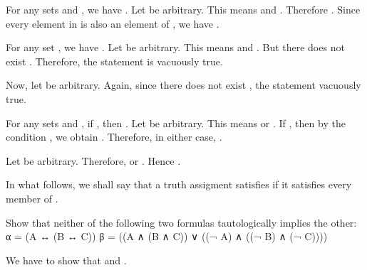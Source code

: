 \startexercises [title={\getvariable{document}{author}  \hfill  \getvariable{document}{course}  \hfill  2019-09-10}]
	
	\startproposition [title={Exercise 1.8}]
		For any sets  and , we have .
	\stopproposition
	\startproof
		Let  be arbitrary. This means  and . Therefore . Since every element in  is also an element of , we have .
	\stopproof

	\startproposition [title={Exercise 1.10}]
		For any set , we have .
	\stopproposition
	\startproof
		Let  be arbitrary. This means  and . But there does not exist . Therefore, the statement is vacuously true.

		Now, let  be arbitrary. Again, since there does not exist , the statement vacuously true.
	\stopproof

	\startproposition [title={Exercise 1.13}]
		For any sets  and , if , then .
	\stopproposition
	\startproof
		Let  be arbitrary. This means  or . If , then by the condition , we obtain . Therefore, in either case, .

		Let  be arbitrary. Therefore,  or . Hence .
	\stopproof

\stopexercises


\startexercises [title={\getvariable{document}{author}  \hfill  \getvariable{document}{course}  \hfill  2019-09-24}]

	In what follows, we shall say that a truth assigment  satisfies  if it satisfies every member of .
	
	\startproposition [title={Exercise 1.2.1}]
		Show that neither of the following two formulas tautologically implies the other:
		\startformula  \startalign[align={right, left}]
			\NC  α =  \NC  (A ↔ (B ↔ C))  \NR
			\NC  β =  \NC  ((A ∧ (B ∧ C)) ∨ ((¬ A) ∧ ((¬ B) ∧ (¬ C))))  \NR
		\stopalign  \stopformula

	\stopproposition
	\startproof
		We have to show that  and .

